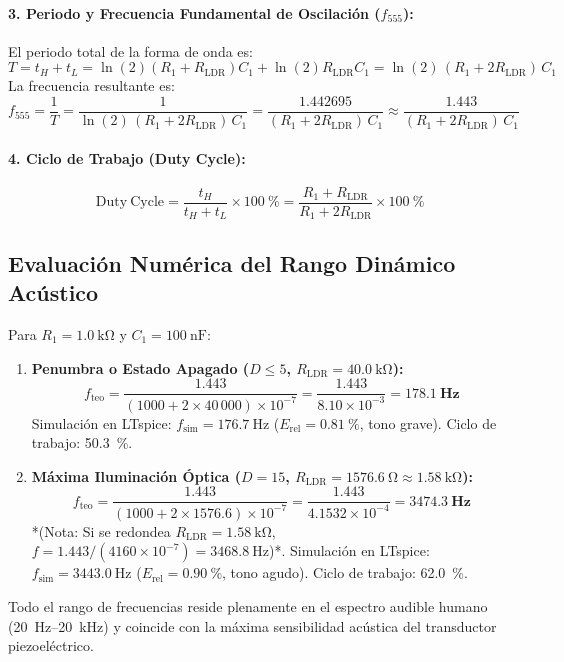 \documentclass[11pt,letterpaper]{article}
\begin{document}
\paragraph{3. Periodo y Frecuencia Fundamental de Oscilación ($f_{555}$):}
El periodo total de la forma de onda es:
\begin{equation}
T = t_H + t_L = \ln(2)(R_1 + R_{\text{LDR}})C_1 + \ln(2)R_{\text{LDR}}C_1 = \ln(2)\,(R_1 + 2R_{\text{LDR}})\,C_1
\label{eq:periodo_555}
\end{equation}
La frecuencia resultante es:
\begin{equation}
\boxed{f_{555} = \frac{1}{T} = \frac{1}{\ln(2)\,(R_1 + 2R_{\text{LDR}})\,C_1} = \frac{1.442695}{(R_1 + 2R_{\text{LDR}})\,C_1} \approx \frac{1.443}{(R_1 + 2R_{\text{LDR}})\,C_1}}
\label{eq:frecuencia_555}
\end{equation}

\paragraph{4. Ciclo de Trabajo (Duty Cycle):}
\begin{equation}
\mathrm{Duty\ Cycle} = \frac{t_H}{t_H + t_L} \times \SI{100}{\percent} = \frac{R_1 + R_{\text{LDR}}}{R_1 + 2R_{\text{LDR}}} \times \SI{100}{\percent}
\label{eq:duty_cycle}
\end{equation}

\subsection{Evaluación Numérica del Rango Dinámico Acústico}
Para $R_1 = \SI{1.0}{\kilo\ohm}$ y $C_1 = \SI{100}{\nano\farad}$:
\begin{enumerate}
    \item \textbf{Penumbra o Estado Apagado ($D \le 5$, $R_{\text{LDR}} = \SI{40.0}{\kilo\ohm}$):}
    \begin{equation}
    f_{\text{teo}} = \frac{1.443}{(1000 + 2 \times 40\,000)\times 10^{-7}} = \frac{1.443}{8.10 \times 10^{-3}} = \mathbf{\SI{178.1}{\hertz}}
    \end{equation}
    Simulación en LTspice: $f_{\text{sim}} = \SI{176.7}{\hertz}$ ($E_{\text{rel}} = \SI{0.81}{\percent}$, tono grave). Ciclo de trabajo: \SI{50.3}{\percent}.
    \item \textbf{Máxima Iluminación Óptica ($D = 15$, $R_{\text{LDR}} = \SI{1576.6}{\ohm} \approx \SI{1.58}{\kilo\ohm}$):}
    \begin{equation}
    f_{\text{teo}} = \frac{1.443}{(1000 + 2 \times 1576.6)\times 10^{-7}} = \frac{1.443}{4.1532 \times 10^{-4}} = \mathbf{\SI{3474.3}{\hertz}}
    \end{equation}
    *(Nota: Si se redondea $R_{\text{LDR}} = \SI{1.58}{\kilo\ohm}$, $f = 1.443 / (4160 \times 10^{-7}) = \SI{3468.8}{\hertz}$)*.
    Simulación en LTspice: $f_{\text{sim}} = \SI{3443.0}{\hertz}$ ($E_{\text{rel}} = \SI{0.90}{\percent}$, tono agudo). Ciclo de trabajo: \SI{62.0}{\percent}.
\end{enumerate}
Todo el rango de frecuencias reside plenamente en el espectro audible humano (\SI{20}{\hertz}--\SI{20}{\kilo\hertz}) y coincide con la máxima sensibilidad acústica del transductor piezoeléctrico.
\end{document}
